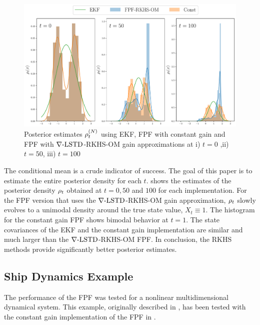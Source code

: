\begin{figure}[htbp]
	\includegraphics[width = 6in] {images/Chap4_Posterior_estimate}
	\caption{ Posterior estimates $\rho_t^{(N)}$ using EKF, FPF with constant gain and FPF with $\nabla\text{-LSTD}$-RKHS-OM gain approximations at i) $t=0$ ,ii) $t = 50$, iii) $t = 100$}
	\label{fig:posterior_estimate}
\end{figure}
The conditional mean is a crude indicator of success. The goal of this paper is to estimate the entire posterior density for each $t$.
 shows the estimates of the posterior density $\rho_t$ obtained at $t=0,50$ and $100$ for each implementation.  For the FPF version that uses the $\nabla\text{-LSTD}$-RKHS-OM gain approximation, $\rho_t$ slowly evolves to a unimodal density around the true state value, $X_t \equiv 1$. The histogram for the constant gain FPF shows bimodal behavior at $t=1$.  The state covariances of the EKF and the constant gain implementation are similar and much larger than the $\nabla\text{-LSTD}$-RKHS-OM FPF. In conclusion, the RKHS methods provide significantly better posterior estimates.


\subsection{Ship Dynamics Example} 
\label{s:ship_dynamics}
The performance of the FPF was tested for a nonlinear multidimensional dynamical system. This example, originally described in \cite{budchelee07}, has been tested with the constant gain implementation of the FPF in \cite{tilghiomeh13}.

